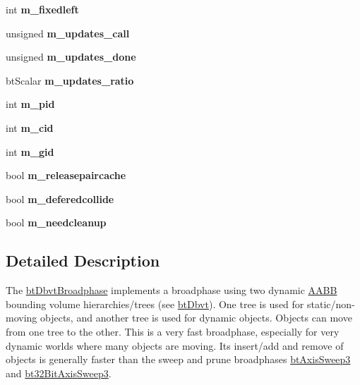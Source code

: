 \begin{DoxyCompactItemize}
int {\bfseries m\+\_\+fixedleft}
\item 
\mbox{\label{structbtDbvtBroadphase_af18173cc63b75086e5759ea1eeae5395}} 
unsigned {\bfseries m\+\_\+updates\+\_\+call}
\item 
\mbox{\label{structbtDbvtBroadphase_a56426b775edabe3c8cc5d8ce35c03bca}} 
unsigned {\bfseries m\+\_\+updates\+\_\+done}
\item 
\mbox{\label{structbtDbvtBroadphase_a33b0079bb3fd6580bc51b7f45ebeac59}} 
bt\+Scalar {\bfseries m\+\_\+updates\+\_\+ratio}
\item 
\mbox{\label{structbtDbvtBroadphase_ab10f36a4f495a6a5309c1e6d82724dfd}} 
int {\bfseries m\+\_\+pid}
\item 
\mbox{\label{structbtDbvtBroadphase_a4c701149a0ec87f96554fee0fde1e3d4}} 
int {\bfseries m\+\_\+cid}
\item 
\mbox{\label{structbtDbvtBroadphase_a5759e68cd5f6cc2df831610eb5d6612b}} 
int {\bfseries m\+\_\+gid}
\item 
\mbox{\label{structbtDbvtBroadphase_a9b9f1b9455b8707e150ac4f29eccdf39}} 
bool {\bfseries m\+\_\+releasepaircache}
\item 
\mbox{\label{structbtDbvtBroadphase_a7ea671ddecbd35dea6dc5c0773b468ac}} 
bool {\bfseries m\+\_\+deferedcollide}
\item 
\mbox{\label{structbtDbvtBroadphase_af37d7e2224bc4d6f0eeb7648538ac0ce}} 
bool {\bfseries m\+\_\+needcleanup}
\end{DoxyCompactItemize}


\subsection{Detailed Description}
The \hyperlink{structbtDbvtBroadphase}{bt\+Dbvt\+Broadphase} implements a broadphase using two dynamic \hyperlink{classAABB}{A\+A\+BB} bounding volume hierarchies/trees (see \hyperlink{structbtDbvt}{bt\+Dbvt}). One tree is used for static/non-\/moving objects, and another tree is used for dynamic objects. Objects can move from one tree to the other. This is a very fast broadphase, especially for very dynamic worlds where many objects are moving. Its insert/add and remove of objects is generally faster than the sweep and prune broadphases \hyperlink{classbtAxisSweep3}{bt\+Axis\+Sweep3} and \hyperlink{classbt32BitAxisSweep3}{bt32\+Bit\+Axis\+Sweep3}. 

